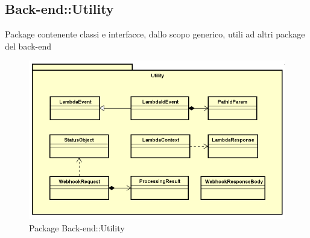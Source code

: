 \subsection{Back-end::Utility}
Package contenente classi e interfacce, dallo scopo generico, utili ad altri package del back-end
\begin{figure}[h] \centering \includegraphics[width=\textwidth,height=\textheight,keepaspectratio]{images/diagrams/back-end/Official_Backend_0304/Utility.png}
	\caption{Package Back-end::Utility}
\end{figure}
\newpage

